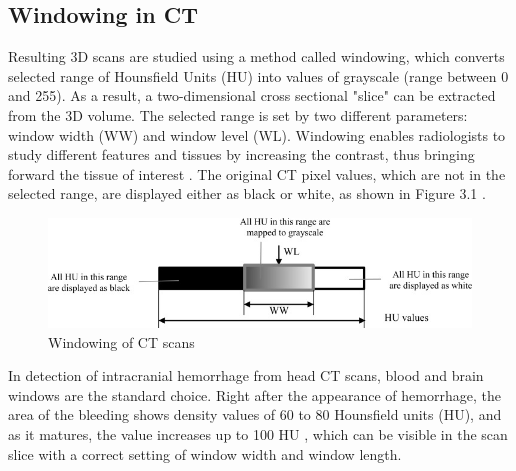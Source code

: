 \subsection*{Windowing in CT}
Resulting 3D scans are studied using a method called windowing, which converts selected range of Hounsfield Units (HU) into values of grayscale (range between 0 and 255).  As a result, a two-dimensional cross sectional "slice" can be extracted from the 3D volume. The selected range is set by two different parameters: window width (WW) and window level (WL). Windowing enables radiologists to study different features and tissues by increasing the contrast, thus bringing forward the tissue of interest \cite{windowClassBiomArt}. The original CT pixel values, which are not in the selected range, are displayed either as black or white, as shown in Figure 3.1 .

\begin{figure}[h]
\begin{centering}
\includegraphics[width=15cm]{assets/images/windowingHU}
\par\end{centering}
\caption[Windowing of CT scans]{Windowing of CT scans
\label{fig:windowing} }
\end{figure}

In detection of intracranial hemorrhage from head CT scans, blood and brain windows are the standard choice. Right after the appearance of hemorrhage, the area of the bleeding shows density values of 60 to 80 Hounsfield units (HU), and as it matures, the value increases up to 100 HU  \cite{principlesOfCT}, which can be visible in the scan slice with a correct setting of window width and window length.


